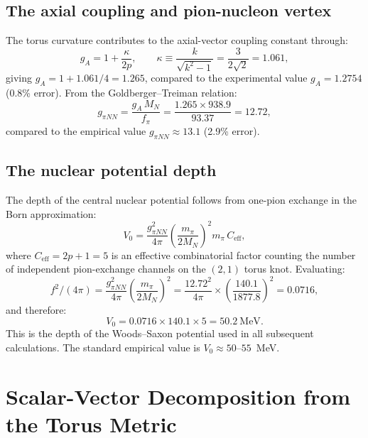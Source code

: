 \documentclass[11pt,a4paper]{article}
\begin{document}
\subsection{The axial coupling and pion-nucleon vertex}

The torus curvature contributes to the axial-vector coupling constant through:
\begin{equation}
  g_A = 1 + \frac{\kappa}{2p}, \qquad
  \kappa \equiv \frac{k}{\sqrt{k^2-1}} = \frac{3}{2\sqrt{2}} = 1.061,
  \label{eq:gA}
\end{equation}
giving $g_A = 1 + 1.061/4 = 1.265$, compared to the experimental value
$g_A = 1.2754$ (0.8\% error).  From the Goldberger--Treiman relation:
\begin{equation}
  g_{\pi NN} = \frac{g_A\, M_N}{f_\pi} = \frac{1.265 \times 938.9}{93.37} = 12.72,
  \label{eq:gpiNN}
\end{equation}
compared to the empirical value $g_{\pi NN} \approx 13.1$ (2.9\% error).

\subsection{The nuclear potential depth}

The depth of the central nuclear potential follows from one-pion exchange
in the Born approximation:
\begin{equation}
  V_0 = \frac{g_{\pi NN}^2}{4\pi}\left(\frac{m_\pi}{2M_N}\right)^2
  m_\pi\, C_{\text{eff}},
  \label{eq:V0}
\end{equation}
where $C_{\text{eff}} = 2p + 1 = 5$ is an effective combinatorial factor
counting the number of independent pion-exchange channels on the $(2,1)$
torus knot.  Evaluating:
\begin{equation}
  f^2/(4\pi) = \frac{g_{\pi NN}^2}{4\pi}\left(\frac{m_\pi}{2M_N}\right)^2
  = \frac{12.72^2}{4\pi} \times \left(\frac{140.1}{1877.8}\right)^2 = 0.0716,
\end{equation}
and therefore:
\begin{equation}
  V_0 = 0.0716 \times 140.1 \times 5 = 50.2~\text{MeV}.
  \label{eq:V0-value}
\end{equation}
This is the depth of the Woods--Saxon potential used in all subsequent
calculations.  The standard empirical value is $V_0 \approx 50$--$55$~MeV.


\section{Scalar-Vector Decomposition from the Torus Metric}
\label{sec:sv}
\end{document}
